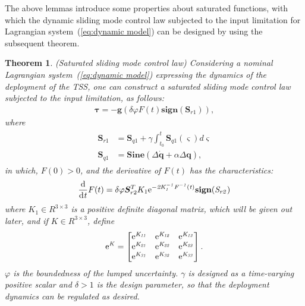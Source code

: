 \documentclass[3p]{elsarticle}
\theoremstyle{plain}
\newtheorem{mythm}{Theorem}
\theoremstyle{remark}
\begin{document}
The above lemmas introduce some properties about saturated functions, with which the dynamic sliding mode control law subjected to the input limitation for Lagrangian system~(\ref{eq:dynamic model}) can be designed by using the subsequent theorem.
\begin{mythm}\label{thm:1}(Saturated sliding mode control law)
Considering a nominal Lagrangian system~(\ref{eq:dynamic model}) expressing the dynamics of the deployment of the TSS, one can construct a saturated sliding mode control law subjected to the input limitation, as follows:
\begin{align}
\bm\tau = -\bm{g}(\delta\varphi F(t) \mathbf{sign}(\bm S_{r1})),\label{eq:slider control}
\end{align}
where
\begin{align}
\begin{split}
\bm S_{r1} &= \bm S_{q1}+\gamma\int^t_{t_0}\bm S_{q1}(\varsigma) d\varsigma\\
\bm S_{q1} &= \mathbf{Sine}(\Delta \dot {\bm q}+\alpha\Delta\bm q),\label{eq:sq1}
\end{split}
\end{align}
in which, $F(0)>0$, and the derivative of $F(t)$ has the characteristics:
\begin{align}
\frac{\rm{d}}{\rm{d}\it{t}}F(t) = \delta\varphi \bm S_{r2}^T K_1\rm{e}\it{^{-2K_1^{-1}F^{-1}(t)}}\mathbf{sign}(\bm {S}_{r2})
\end{align}
where $K_1\in R^{3\times 3}$ is a positive definite diagonal matrix, which will be given out later, and if $K\in R^{3\times 3}$, define
\begin{align}
\rm{e}\it{^K}=
\begin{bmatrix}
\rm{e}\it{^{K_{11}}}&\rm{e}\it{^{K_{12}}}&\rm{e}\it{^{K_{13}}}\\
\rm{e}\it{^{K_{21}}}&\rm{e}\it{^{K_{22}}}&\rm{e}\it{^{K_{23}}}\\
\rm{e}\it{^{K_{31}}}&\rm{e}\it{^{K_{32}}}&\rm{e}\it{^{K_{33}}}
\end{bmatrix}.
\end{align}
$\varphi$ is the boundedness of the lumped uncertainty. $\gamma$ is designed as a time-varying positive scalar and $\delta>1$ is the design parameter, so that the deployment dynamics can be regulated as desired.
\end{mythm}
\end{document}
